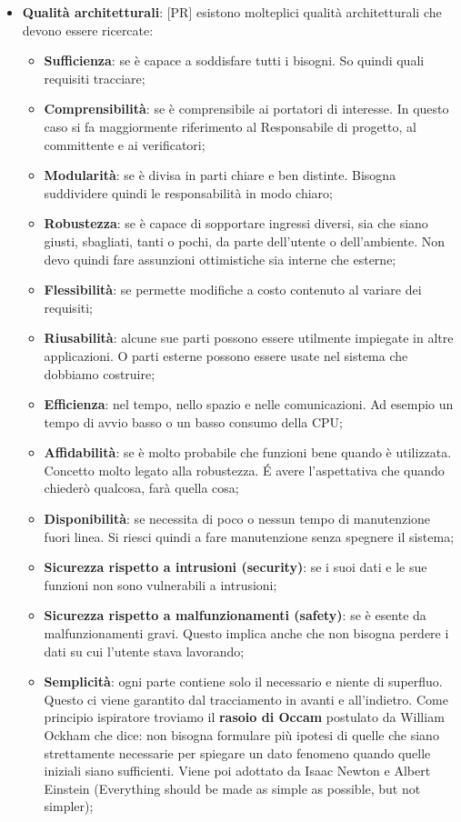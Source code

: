 \begin{itemize}
		\item \textbf{Qualità architetturali}: [PR] esistono molteplici qualità architetturali che devono essere ricercate:
			\begin{itemize}
				\item \textbf{Sufficienza}: se è capace a soddisfare tutti i bisogni. So quindi quali requisiti tracciare;
				\item \textbf{Comprensibilità}: se è comprensibile ai portatori di interesse. In questo caso si fa maggiormente riferimento al Responsabile di progetto, al committente e ai verificatori;
				\item \textbf{Modularità}: se è divisa in parti chiare e ben distinte. Bisogna suddividere quindi le responsabilità in modo chiaro;
				\item \textbf{Robustezza}: se è capace di sopportare ingressi diversi, sia che siano giusti, sbagliati, tanti o pochi, da parte dell'utente o dell'ambiente. Non devo quindi fare assunzioni ottimistiche sia interne che esterne;
				\item \textbf{Flessibilità}: se permette modifiche a costo contenuto al variare dei requisiti;
				\item \textbf{Riusabilità}: alcune sue parti possono essere utilmente impiegate in altre applicazioni. O parti esterne possono essere usate nel sistema che dobbiamo costruire;
				\item \textbf{Efficienza}: nel tempo, nello spazio e nelle comunicazioni. Ad esempio un tempo di avvio basso o un basso consumo della CPU;
				\item \textbf{Affidabilità}: se è molto probabile che funzioni bene quando è utilizzata. Concetto molto legato alla robustezza. \'E avere l'aspettativa che quando chiederò qualcosa, farà quella cosa;
				\item \textbf{Disponibilità}: se necessita di poco o nessun tempo di manutenzione fuori linea. Si riesci quindi a fare manutenzione senza spegnere il sistema;
				\item \textbf{Sicurezza rispetto a intrusioni (security)}: se i suoi dati e le sue funzioni non sono vulnerabili a intrusioni;
				\item \textbf{Sicurezza rispetto a malfunzionamenti (safety)}: se è esente da malfunzionamenti gravi. Questo implica anche che non bisogna perdere i dati su cui l'utente stava lavorando;
				\item \textbf{Semplicità}: ogni parte contiene solo il necessario e niente di superfluo. Questo ci viene garantito dal tracciamento in avanti e all'indietro. Come principio ispiratore troviamo il \textbf{rasoio di Occam} postulato da William Ockham che dice: non bisogna formulare più ipotesi di quelle che siano strettamente necessarie per spiegare un dato fenomeno quando quelle iniziali siano sufficienti. Viene poi adottato da Isaac Newton e Albert Einstein (Everything should be made as simple as possible, but not simpler);

\end{itemize}
\end{itemize}
